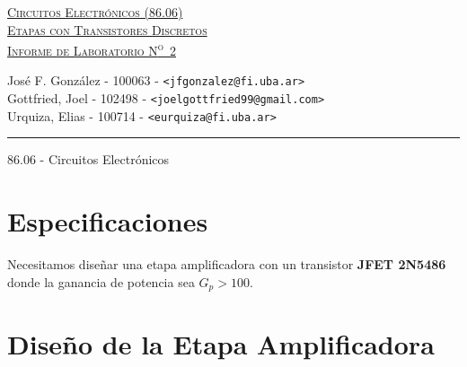 \documentclass[a4paper, 10pt, spanish]{article}
\begin{document}
\begin{titlepage}
\vfill

\begin{center} %
\Large{\underline{\textsc{Circuitos Electrónicos (86.06)}}}\\ \vspace{0.5cm}
\Large{\underline{\textsc{Etapas con Transistores Discretos}}}\\ \vspace{0.5cm}
\Large{\underline{\textsc{Informe de Laboratorio N\textsuperscript{o}~2}}}
\end{center}

\vfill

\begin{center}
\large{José F. González - 100063 - \footnotesize{\verb!<jfgonzalez@fi.uba.ar>!}}\\ \vspace{0.25cm}
\large{Gottfried, Joel - 102498 - \footnotesize{\verb!<joelgottfried99@gmail.com>!}}\\\vspace{0.25cm}
\large{Urquiza, Elias - 100714 - \footnotesize{\verb!<eurquiza@fi.uba.ar>!}}\\
\end{center}

\vfill

\hrule
\vspace{0.2cm}

\noindent\small{86.06 - Circuitos Electrónicos \hfill }

\end{titlepage}

%
%
\setcounter{page}{1}

%
%
\tableofcontents
\newpage


\section{Especificaciones}

Necesitamos diseñar una etapa amplificadora con un transistor \textbf{JFET 2N5486} donde la ganancia de potencia sea $G_p > 100$.

\section{Diseño de la Etapa Amplificadora}
\end{document}
